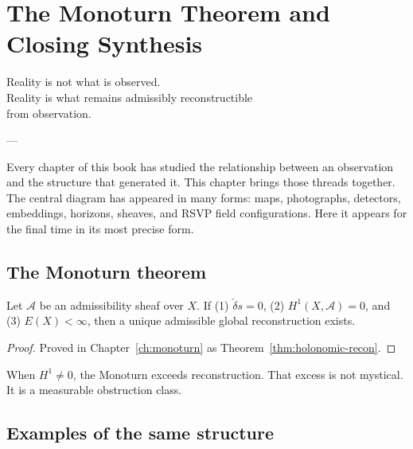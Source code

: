 
\chapter{The Monoturn Theorem and Closing Synthesis}
\label{ch:philosophical-consequences}

\epigraph{%
  Reality is not what is observed.\\
  Reality is what remains admissibly reconstructible\\
  from observation.%
}{---}

\begin{WhyChapter}
  Every chapter of this book has studied the relationship
  between an observation and the structure that generated it.
  This chapter brings those threads together.
  The central diagram has appeared in many forms:
  maps, photographs, detectors, embeddings, horizons,
  sheaves, and RSVP field configurations.
  Here it appears for the final time in its most precise form.
\end{WhyChapter}

\section{The Monoturn theorem}

\begin{theorem}
  \label{thm:monoturn-final}
  \statusproven{}
  Let $\mathcal{A}$ be an admissibility sheaf over $X$.
  If (1) $\check{\delta}s = 0$, (2) $H^1(X,\mathcal{A}) = 0$,
  and (3) $E(X) < \infty$, then a unique admissible global
  reconstruction exists.
\end{theorem}

\begin{proof}
  Proved in Chapter~\ref{ch:monoturn} as
  Theorem~\ref{thm:holonomic-recon}.
\end{proof}

When $H^1 \neq 0$, the Monoturn exceeds reconstruction.
That excess is not mystical. It is a measurable obstruction class.

\section{Examples of the same structure}

